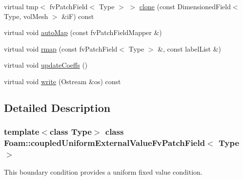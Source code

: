 \begin{DoxyCompactItemize}
\item 
virtual tmp$<$ fv\+Patch\+Field$<$ Type $>$ $>$ \hyperlink{classFoam_1_1coupledUniformExternalValueFvPatchField_a6dfbb046cc414bcb0ee27a1646815537}{clone} (const Dimensioned\+Field$<$ Type, vol\+Mesh $>$ \&iF) const
\item 
virtual void \hyperlink{classFoam_1_1coupledUniformExternalValueFvPatchField_a0ab0c43ce90d756c88dd81e3d0a9eef5}{auto\+Map} (const fv\+Patch\+Field\+Mapper \&)
\item 
virtual void \hyperlink{classFoam_1_1coupledUniformExternalValueFvPatchField_abe233fd0f00c5f2012c2a8f57f20f5cb}{rmap} (const fv\+Patch\+Field$<$ Type $>$ \&, const label\+List \&)
\item 
virtual void \hyperlink{classFoam_1_1coupledUniformExternalValueFvPatchField_a7e24eafac629d3733181cd942d4c902f}{update\+Coeffs} ()
\item 
virtual void \hyperlink{classFoam_1_1coupledUniformExternalValueFvPatchField_a78cec3e4ecac4a89a3ad8d38f2ad21f5}{write} (Ostream \&os) const
\end{DoxyCompactItemize}


\subsection{Detailed Description}
\subsubsection*{template$<$class Type$>$\newline
class Foam\+::coupled\+Uniform\+External\+Value\+Fv\+Patch\+Field$<$ Type $>$}

This boundary condition provides a uniform fixed value condition. 

